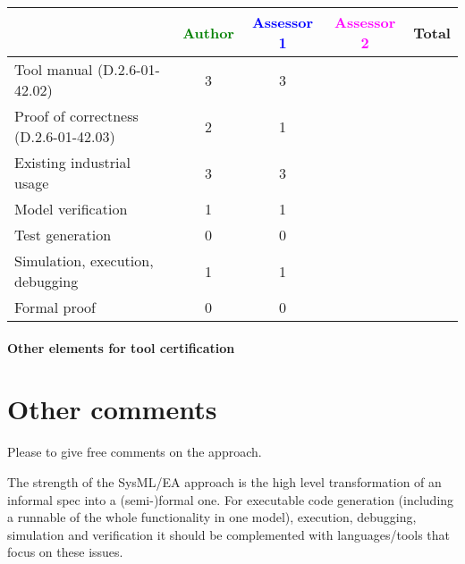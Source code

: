 \begin{tabular}{|l | c | c | c | c|}
\hline
& \textcolor{green}{Author} & \textcolor{blue}{Assessor 1} & \textcolor{magenta}{Assessor 2} & Total \\
\hline 
Tool manual (D.2.6-01-42.02) &3 & 3& &  \\
\hline
Proof of correctness (D.2.6-01-42.03)   &2 & 1& & \\
\hline
Existing industrial  usage  &3 & 3& & \\
\hline
Model verification &1 & 1& & \\
\hline
Test generation &0 & 0& & \\
\hline
Simulation, execution, debugging &1 & 1& & \\
\hline
Formal proof &0 & 0& & \\
\hline
\end{tabular}

\paragraph{Other elements for tool certification}

\section{Other comments}
Please to  give free comments on the approach.

\begin{assessor1}
The strength of the SysML/EA approach is the high level transformation of an informal spec into a (semi-)formal one. 
For executable code generation (including a runnable of the whole functionality in one model), execution, debugging, simulation and verification it should be complemented with languages/tools that focus on these issues.
\end{assessor1}



